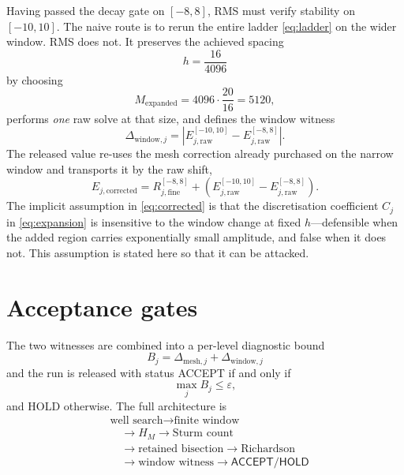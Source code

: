 \documentclass[twocolumn,10pt,a4paper]{article}
\theoremstyle{plain}
\theoremstyle{definition}
\newcommand{\eps}{\varepsilon}
\newcommand{\ACCEPT}{\textsf{ACCEPT}}
\newcommand{\HOLD}{\textsf{HOLD}}
\begin{document}
Having passed the decay gate on $[-8,8]$, RMS must verify stability on
$[-10,10]$. The naive route is to rerun the entire ladder \eqref{eq:ladder} on
the wider window. RMS does not. It preserves the achieved spacing
\begin{equation}
h = \frac{16}{4096}
\end{equation}
by choosing
\begin{equation}
M_{\mathrm{expanded}} = 4096 \cdot \frac{20}{16} = 5120,
\end{equation}
performs \emph{one} raw solve at that size, and defines the window witness
\begin{equation}
\Delta_{\mathrm{window},j} =
\left| E_{j,\mathrm{raw}}^{[-10,10]} - E_{j,\mathrm{raw}}^{[-8,8]} \right| .
\label{eq:windowwitness}
\end{equation}
The released value re-uses the mesh correction already purchased on the narrow
window and transports it by the raw shift,
\begin{equation}
E_{j,\mathrm{corrected}} =
R_{j,\mathrm{fine}}^{[-8,8]}
+ \left( E_{j,\mathrm{raw}}^{[-10,10]} - E_{j,\mathrm{raw}}^{[-8,8]} \right).
\label{eq:corrected}
\end{equation}
The implicit assumption in \eqref{eq:corrected} is that the discretisation
coefficient $C_{j}$ in \eqref{eq:expansion} is insensitive to the window change
at fixed $h$---defensible when the added region carries exponentially small
amplitude, and false when it does not. This assumption is stated here so that it
can be attacked.

\section{Acceptance gates}
\label{sec:gates}

The two witnesses are combined into a per-level diagnostic bound
\begin{equation}
\boxed{\,B_{j} = \Delta_{\mathrm{mesh},j} + \Delta_{\mathrm{window},j}\,}
\label{eq:bound}
\end{equation}
and the run is released with status \ACCEPT{} if and only if
\begin{equation}
\max_{j} B_{j} \le \eps ,
\end{equation}
and \HOLD{} otherwise. The full architecture is
\begin{equation}
\boxed{
\begin{aligned}
&\text{well search} \rightarrow \text{finite window}\\
&\quad \rightarrow H_{M} \rightarrow \text{Sturm count}\\
&\quad \rightarrow \text{retained bisection}
\rightarrow \text{Richardson}\\
&\quad \rightarrow \text{window witness}
\rightarrow \ACCEPT/\HOLD
\end{aligned}}
\end{equation}
\end{document}
